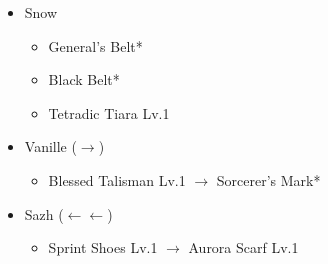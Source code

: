 \begin{menu}
\begin{itemize}
\begin{itemize}
		\end{itemize}
	\equip
		\begin{itemize}
			\item Snow
				\begin{itemize}
					\item General's Belt*
					\item Black Belt*
					\item Tetradic Tiara Lv.1
				\end{itemize}
			\item Vanille ($\rightarrow$)
				\begin{itemize}
					\item Blessed Talisman Lv.1 $\rightarrow$ Sorcerer's Mark*
				\end{itemize}
			\item Sazh ($\leftarrow\leftarrow$)
				\begin{itemize}
					\item Sprint Shoes Lv.1 $\rightarrow$ Aurora Scarf Lv.1
				\end{itemize}
		\end{itemize}
	\end{itemize}
\end{menu}

\renewcommand{\first}{[1] Mystic Tower (\rav/\sen/\rav)}
\renewcommand{\third}{[3] Protection (\syn/\sen/\med)}
\renewcommand{\fourth}{[4] Entourage (\rav/\sen/\med)}

